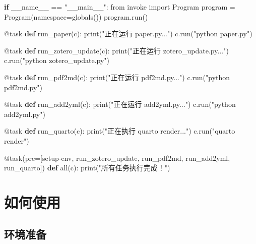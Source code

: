 \documentclass[
  letterpaper,
  DIV=11,
  numbers=noendperiod]{scrreprt}
\newenvironment{Shaded}{\begin{snugshade}}{\end{snugshade}}
\newcommand{\AttributeTok}[1]{\textcolor[rgb]{0.40,0.45,0.13}{#1}}
\newcommand{\BuiltInTok}[1]{\textcolor[rgb]{0.00,0.23,0.31}{#1}}
\newcommand{\ControlFlowTok}[1]{\textcolor[rgb]{0.00,0.23,0.31}{\textbf{#1}}}
\newcommand{\ImportTok}[1]{\textcolor[rgb]{0.00,0.46,0.62}{#1}}
\newcommand{\KeywordTok}[1]{\textcolor[rgb]{0.00,0.23,0.31}{\textbf{#1}}}
\newcommand{\NormalTok}[1]{\textcolor[rgb]{0.00,0.23,0.31}{#1}}
\newcommand{\OperatorTok}[1]{\textcolor[rgb]{0.37,0.37,0.37}{#1}}
\newcommand{\StringTok}[1]{\textcolor[rgb]{0.13,0.47,0.30}{#1}}
\newcommand{\VariableTok}[1]{\textcolor[rgb]{0.07,0.07,0.07}{#1}}
\begin{document}
\begin{Shaded}
\begin{Highlighting}[]
\ControlFlowTok{if} \VariableTok{\_\_name\_\_} \OperatorTok{==} \StringTok{"\_\_main\_\_"}\NormalTok{:}
    \ImportTok{from}\NormalTok{ invoke }\ImportTok{import}\NormalTok{ Program}
\NormalTok{    program }\OperatorTok{=}\NormalTok{ Program(namespace}\OperatorTok{=}\BuiltInTok{globals}\NormalTok{())}
\NormalTok{    program.run()}



\AttributeTok{@task}
\KeywordTok{def}\NormalTok{ run\_paper(c):}
    \BuiltInTok{print}\NormalTok{(}\StringTok{"正在运行 paper.py..."}\NormalTok{)}
\NormalTok{    c.run(}\StringTok{"python paper.py"}\NormalTok{)    }

\AttributeTok{@task}
\KeywordTok{def}\NormalTok{ run\_zotero\_update(c):}
    \BuiltInTok{print}\NormalTok{(}\StringTok{"正在运行 zotero\_update.py..."}\NormalTok{)}
\NormalTok{    c.run(}\StringTok{"python zotero\_update.py"}\NormalTok{)}

\AttributeTok{@task}
\KeywordTok{def}\NormalTok{ run\_pdf2md(c):}
    \BuiltInTok{print}\NormalTok{(}\StringTok{"正在运行 pdf2md.py..."}\NormalTok{)}
\NormalTok{    c.run(}\StringTok{"python pdf2md.py"}\NormalTok{)}

\AttributeTok{@task}
\KeywordTok{def}\NormalTok{ run\_add2yml(c):}
    \BuiltInTok{print}\NormalTok{(}\StringTok{"正在运行 add2yml.py..."}\NormalTok{)}
\NormalTok{    c.run(}\StringTok{"python add2yml.py"}\NormalTok{)}

\AttributeTok{@task}
\KeywordTok{def}\NormalTok{ run\_quarto(c):}
    \BuiltInTok{print}\NormalTok{(}\StringTok{"正在执行 quarto render..."}\NormalTok{)}
\NormalTok{    c.run(}\StringTok{"quarto render"}\NormalTok{)}

\AttributeTok{@task}\NormalTok{(pre}\OperatorTok{=}\NormalTok{[setup}\OperatorTok{{-}}\NormalTok{env, run\_zotero\_update, run\_pdf2md, run\_add2yml, run\_quarto])}
\KeywordTok{def} \BuiltInTok{all}\NormalTok{(c):}
    \BuiltInTok{print}\NormalTok{(}\StringTok{"所有任务执行完成！"}\NormalTok{)}
\end{Highlighting}
\end{Shaded}


\chapter{如何使用}\label{ux5982ux4f55ux4f7fux7528}

\section{环境准备}\label{ux73afux5883ux51c6ux5907}
\end{document}
